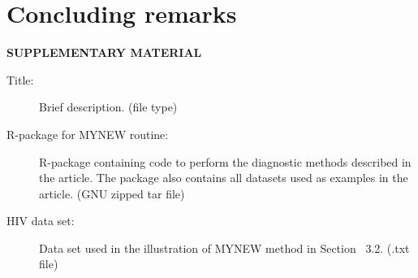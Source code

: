 \documentclass[11pt]{article}
\begin{document}
\section{Concluding remarks}
\label{sec:conc}


\appendix
% 

\bigskip
\begin{center}
{\large\bf SUPPLEMENTARY MATERIAL}
\end{center}

\begin{description}

\item[Title:] Brief description. (file type)

\item[R-package for  MYNEW routine:] R-package containing code to perform the diagnostic methods described in the article. The package also contains all datasets used as examples in the article. (GNU zipped tar file)

\item[HIV data set:] Data set used in the illustration of MYNEW method in Section~ 3.2. (.txt file)

\end{description}




\end{document}
